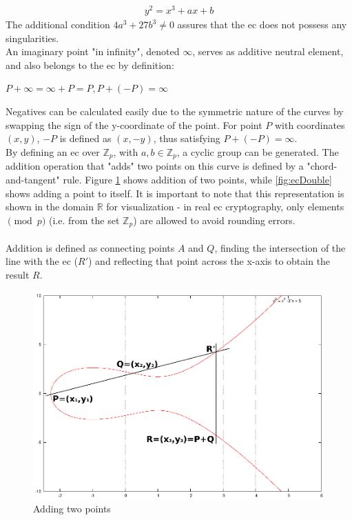 \begin{align}\label{basicEC}
 y^2 = x^3 + ax +b
\end{align}
The additional condition $4a^3 + 27b^3 \neq 0$ assures that the \gls{ec} does not possess any singularities.
\\
An imaginary point "in infinity", denoted $\infty$, serves as additive neutral element, and also belongs to the \gls{ec} by definition:
\begin{center}
 $P + \infty = \infty + P = P, P + (-P) = \infty$
\end{center}
Negatives can be calculated easily due to the symmetric nature of the curves by swapping the sign of the y-coordinate of the point. For point $P$ with coordinates $(x, y)$, $-P$ is defined as
$(x,-y)$, thus satisfying $P + (-P) = \infty$.
\\
By defining an \gls{ec} over $\mathbb{Z}_p$, with $a, b \in \mathbb{Z}_p$, a cyclic group can be generated. The addition operation that "adds" two points on
this curve is defined by a "chord-and-tangent" rule. Figure \ref{fig:ecAdd}
shows addition of two points, while \ref{fig:ecDouble} shows adding a point to itself. It is important to note that this representation is shown in the domain
$\mathbb{R}$ for visualization - in real \gls{ec} cryptography, only elements $\pmod p$ (i.e. from the set $\mathbb{Z}_p$)
are allowed to avoid rounding errors. 
\\
\\
Addition is defined as connecting points $A$ and 
$Q$, finding the intersection of the line with the \gls{ec} ($R'$) and reflecting that point across the x-axis to obtain the result $R$. 
          \begin{figure}[H]
          \centering
              \includegraphics[width=0.6\linewidth]{figures/ecAdd.eps}
              \caption{Adding two points}
              \label{fig:ecAdd}
          \end{figure}
